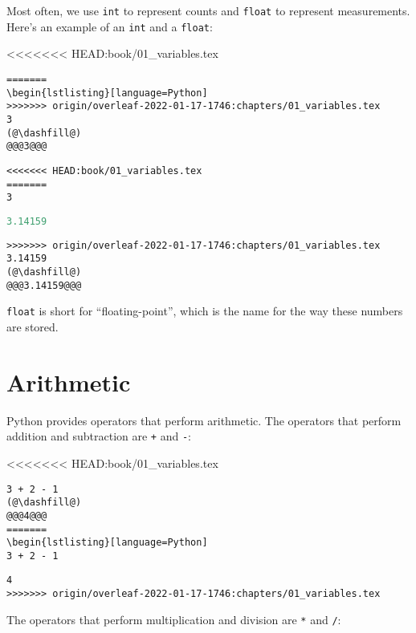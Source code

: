 Most often, we use \passthrough{\lstinline!int!} to represent counts and
\passthrough{\lstinline!float!} to represent measurements. Here's an
example of an \passthrough{\lstinline!int!} and a
\passthrough{\lstinline!float!}:

<<<<<<< HEAD:book/01_variables.tex
\begin{lstlisting}[]
=======
\begin{lstlisting}[language=Python]
>>>>>>> origin/overleaf-2022-01-17-1746:chapters/01_variables.tex
3
(@\dashfill@)
@@@3@@@
\end{lstlisting}

\begin{lstlisting}[]
<<<<<<< HEAD:book/01_variables.tex
=======
3
\end{lstlisting}

\begin{lstlisting}[language=Python]
3.14159
\end{lstlisting}

\begin{lstlisting}[]
>>>>>>> origin/overleaf-2022-01-17-1746:chapters/01_variables.tex
3.14159
(@\dashfill@)
@@@3.14159@@@
\end{lstlisting}

\passthrough{\lstinline!float!} is short for ``floating-point'', which
is the name for the way these numbers are stored.

\hypertarget{arithmetic}{%
\section{Arithmetic}\label{arithmetic}}

Python provides operators that perform arithmetic. The operators that
perform addition and subtraction are \passthrough{\lstinline!+!} and
\passthrough{\lstinline!-!}:

<<<<<<< HEAD:book/01_variables.tex
\begin{lstlisting}[]
3 + 2 - 1
(@\dashfill@)
@@@4@@@
=======
\begin{lstlisting}[language=Python]
3 + 2 - 1
\end{lstlisting}

\begin{lstlisting}[]
4
>>>>>>> origin/overleaf-2022-01-17-1746:chapters/01_variables.tex
\end{lstlisting}

The operators that perform multiplication and division are
\passthrough{\lstinline!*!} and \passthrough{\lstinline!/!}:

